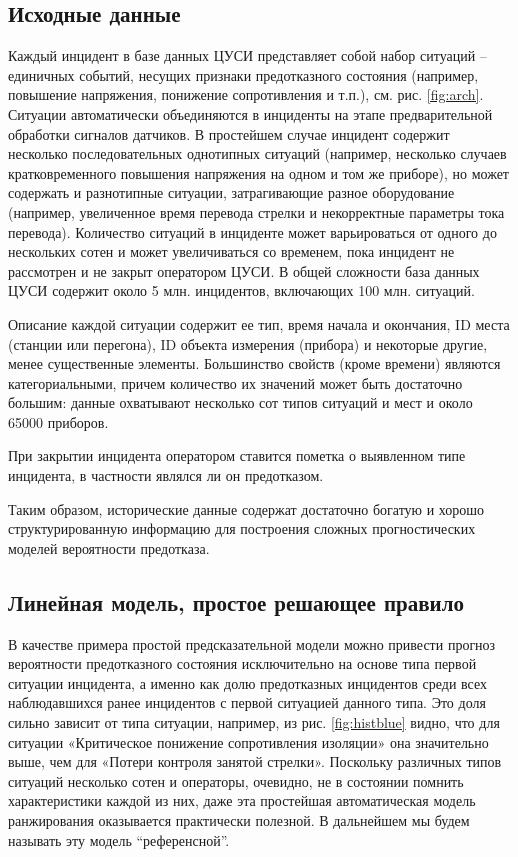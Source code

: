 \subsection{Исходные данные}
Каждый инцидент в базе данных ЦУСИ представляет собой набор ситуаций -- единичных событий, несущих признаки предотказного состояния (например, повышение напряжения, понижение сопротивления и т.п.), см. рис. \ref{fig:arch}. Ситуации автоматически объединяются в инциденты на этапе предварительной обработки сигналов датчиков. В простейшем случае инцидент содержит несколько последовательных однотипных ситуаций (например, несколько случаев кратковременного повышения напряжения на одном и том же приборе), но может содержать и разнотипные ситуации, затрагивающие разное оборудование (например, увеличенное время перевода стрелки и некорректные параметры тока перевода). Количество ситуаций в инциденте может варьироваться от одного до нескольких сотен и может увеличиваться со временем, пока инцидент не рассмотрен и не закрыт оператором ЦУСИ. В общей сложности база данных ЦУСИ содержит около 5 млн. инцидентов, включающих 100 млн. ситуаций.

Описание каждой ситуации содержит ее тип, время начала и окончания,
ID места (станции или перегона), ID объекта измерения (прибора) и некоторые другие, менее существенные элементы. Большинство свойств (кроме времени) являются категориальными, причем количество их значений может быть достаточно большим: данные охватывают несколько сот типов ситуаций и мест и около 65000 приборов.

При закрытии инцидента оператором ставится пометка о выявленном типе инцидента, в частности являлся ли он предотказом.

Таким образом, исторические данные содержат достаточно богатую и хорошо структурированную информацию для построения сложных прогностических моделей вероятности предотказа.

\subsection{Линейная модель, простое решающее правило}\label{sec:ref_model}

В качестве примера простой предсказательной модели можно привести прогноз вероятности предотказного состояния исключительно на основе типа первой ситуации инцидента, а именно как долю предотказных инцидентов среди всех наблюдавшихся ранее инцидентов с первой ситуацией данного типа. Это доля сильно зависит от типа ситуации, например, из рис. \ref{fig:histblue} видно, что для ситуации «Критическое понижение сопротивления изоляции» она значительно выше, чем для «Потери контроля занятой стрелки». Поскольку различных типов ситуаций несколько сотен и операторы, очевидно, не в состоянии помнить характеристики каждой из них, даже эта простейшая автоматическая модель ранжирования оказывается практически полезной. В дальнейшем мы будем называть эту модель ``референсной''.

